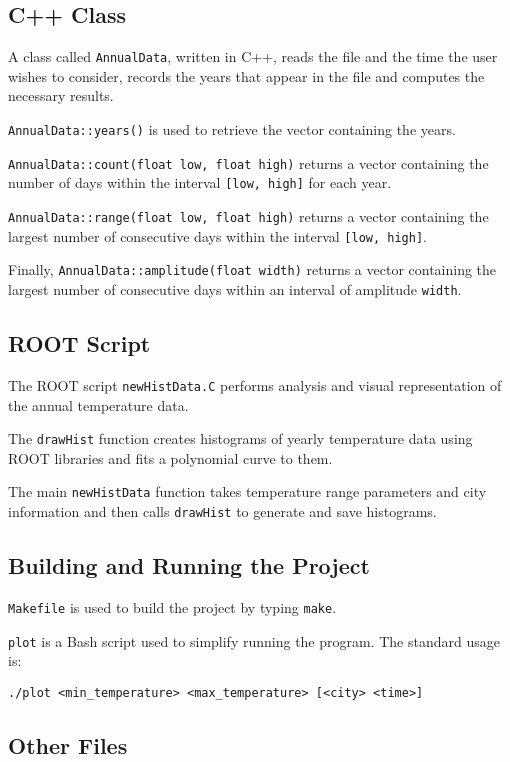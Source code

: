 \documentclass[12pt]{article}
\begin{document}
\subsection{C++ Class}

A class called {\tt AnnualData}, written in C++, reads the file and the time the user wishes to consider, records the years that appear in the file and computes the necessary results.

{\tt AnnualData::years()} is used to retrieve the vector containing the years.

{\tt AnnualData::count(float low, float high)} returns a vector containing the number of days within the interval  {\tt [low, high]} for each year.

{\tt AnnualData::range(float low, float high)} returns a vector containing the largest number of consecutive days within the interval {\tt [low, high]}.

Finally, {\tt AnnualData::amplitude(float width)} returns a vector containing the largest number of consecutive days within an interval of amplitude {\tt width}.

\subsection{ROOT Script}

The ROOT script {\tt newHistData.C} performs analysis and visual representation of the annual temperature data. 

The {\tt drawHist} function creates histograms of yearly temperature data using ROOT libraries and fits a polynomial curve to them.

The main {\tt newHistData} function takes temperature range parameters and city information and then calls {\tt drawHist} to generate and save histograms.

\subsection{Building and Running the Project}

{\tt Makefile} is used to build the project by typing {\tt make}.

{\tt plot} is a Bash script used to simplify running the program. The standard usage is: \begin{center}
{\tt ./plot <min\_temperature> <max\_temperature> [<city> <time>]}
\end{center}

\subsection{Other Files}
\end{document}
